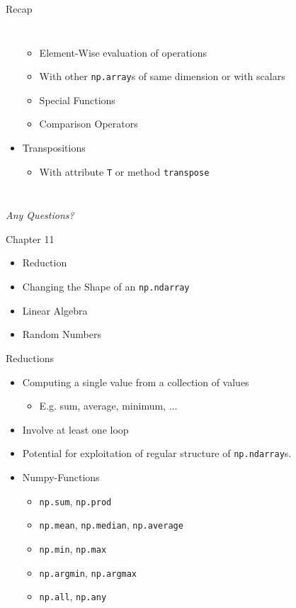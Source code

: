 \begin{frame}{Recap}
\begin{columns}[T]
\begin{itemize}
\begin{itemize}
	\item Element-Wise evaluation of operations
	\item With other \texttt{np.array}s of same dimension or with scalars
	\item Special Functions
	\item Comparison Operators
	\end{itemize}
\item Transpositions
	\begin{itemize}
	\item With attribute \texttt{T} or method \texttt{transpose}
	\end{itemize}
\end{itemize}

\end{columns}
%
\begin{center}
	\emph{Any Questions?}
\end{center}
%
\end{frame}


\begin{frame}[fragile]{Chapter 11}
%
\begin{itemize}
\item Reduction
\item Changing the Shape of an \texttt{np.ndarray}
\item Linear Algebra
\item Random Numbers
\end{itemize}
%
\end{frame}


\begin{frame}[fragile]{Reductions}
%
\begin{itemize}
\item Computing a single value from a collection of values
	\begin{itemize}
	\item E.\;g. sum, average, minimum, ...
	\end{itemize}
\item Involve at least one loop
\item Potential for exploitation of regular structure of \texttt{np.ndarray}s.
\item[\Thus] Numpy-Functions
	\begin{itemize}
	\item \texttt{np.sum}, \texttt{np.prod}
	\item \texttt{np.mean}, \texttt{np.median}, \texttt{np.average}
	\item \texttt{np.min}, \texttt{np.max}
	\item \texttt{np.argmin}, \texttt{np.argmax}
	\item \texttt{np.all}, \texttt{np.any}
	\end{itemize}

\end{itemize}
%
\end{frame}

